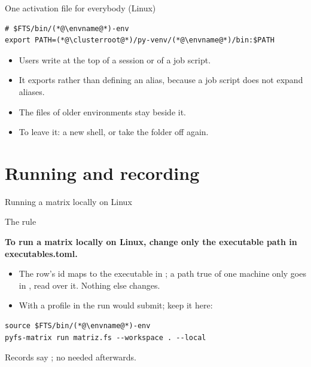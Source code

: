 \documentclass[aspectratio=169,11pt]{beamer}
\begin{document}
\begin{frame}[fragile]{One activation file for everybody (Linux)}
\begin{lstlisting}[style=ftsbase]
# $FTS/bin/(*@\envname@*)-env
export PATH=(*@\clusterroot@*)/py-venv/(*@\envname@*)/bin:$PATH
\end{lstlisting}
\begin{itemize}\small
  \item Users write  at the top of a
        session or of a job script.
  \item It exports  rather than defining an alias, because a job
        script does not expand aliases.
  \item The files of older environments stay beside it.
  \item To leave it: a new shell, or take the folder off  again.
\end{itemize}
\end{frame}

\section{Running and recording}

\begin{frame}[fragile]{Running a matrix locally on Linux}
\begin{block}{The rule}
{\relax
\textbf{To run a matrix locally on Linux, change only the executable path in executables.toml.}\par}
\end{block}
\begin{itemize}\small
  \item The row's  id maps to the executable in
        ; a path true of one machine only goes in
        , read over it. Nothing else changes.
  \item With a profile in  the run would submit; keep it here:
\end{itemize}
\begin{lstlisting}[style=ftsbase]
source $FTS/bin/(*@\envname@*)-env
pyfs-matrix run matriz.fs --workspace . --local
\end{lstlisting}
\small Records say ; no  needed afterwards.
\end{frame}
\end{document}
